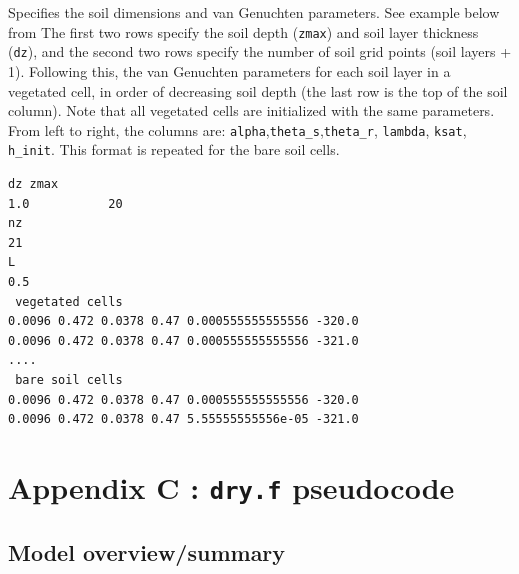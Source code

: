 \documentclass{article}
\newcommand{\code}[1]{\texttt{#1}}
\begin{document}
Specifies the soil dimensions and van Genuchten parameters.  See example below from 
The first two rows specify the soil depth (\code{zmax}) and soil layer thickness (\code{dz}), and the second two rows specify the number of soil grid points (soil layers + 1).  
Following this, the van Genuchten parameters for each soil layer in a vegetated cell, in order of decreasing soil depth (the last row is the top of the soil column). Note that all vegetated cells are initialized with the same parameters.
From left to right, the columns are: 
	\code{alpha},\code{theta\_s},\code{theta\_r}, \code{lambda}, \code{ksat}, \code{h\_init}.  This format is repeated for the bare soil cells.  
	
\begin{verbatim}
dz zmax 
1.0           20             
nz 
21             
L 
0.5            
 vegetated cells  
0.0096 0.472 0.0378 0.47 0.000555555555556 -320.0 
0.0096 0.472 0.0378 0.47 0.000555555555556 -321.0
....
 bare soil cells 
0.0096 0.472 0.0378 0.47 0.000555555555556 -320.0 
0.0096 0.472 0.0378 0.47 5.55555555556e-05 -321.0 
\end{verbatim}


\section*{Appendix C : \code{dry.f} pseudocode}

\subsection{ Model overview/summary}
\end{document}
